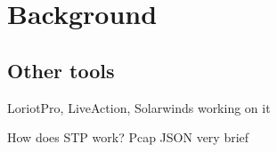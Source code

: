 \chapter{Background}
\section{Other tools}
LoriotPro, LiveAction, Solarwinds working on it

How does STP work?
Pcap
JSON very brief
